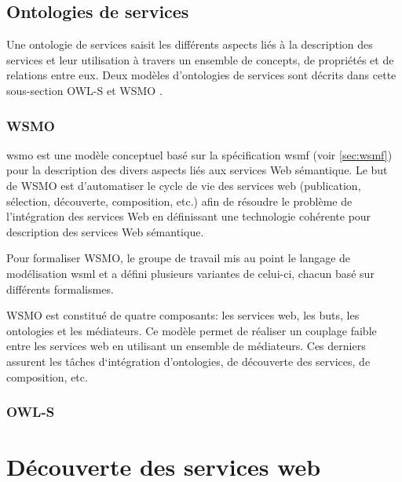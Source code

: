   \subsection{Ontologies de services}
  \label{sec:ont-serices}

  Une ontologie de services saisit les différents aspects liés à la
  description des services et leur utilisation à travers un ensemble
  de concepts, de propriétés et de relations entre eux. Deux modèles
  d'ontologies de services sont décrits dans cette sous-section
  \textsc{OWL-S} et \textsc{WSMO} \cite{elie2010}.

    \subsubsection{WSMO}
    \label{sec:wsmo}

    \acrshort{wsmo} \cite{de2005web} est une modèle conceptuel basé
    sur la spécification \acrshort{wsmf} \cite{fensel2002web} (voir
    \ref{sec:wsmf}) pour la description des divers aspects liés aux
    services Web sémantique. Le but de \textsc{WSMO} est d'automatiser
    le cycle de vie des services web (publication, sélection,
    découverte, composition, etc.) afin de résoudre le problème de
    l'intégration des services Web en définissant une technologie
    cohérente pour description des services Web sémantique.

    Pour formaliser \textsc{WSMO}, le groupe de travail mis au point
    le langage de modélisation \acrshort{wsml} \cite{de2006web} et a
    défini plusieurs variantes de celui-ci, chacun basé sur différents
    formalismes.

    \textsc{WSMO} est constitué de quatre composants: les services
    web, les buts, les ontologies et les médiateurs. Ce modèle permet
    de réaliser un couplage faible entre les services web en utilisant
    un ensemble de médiateurs. Ces derniers assurent les tâches
    d‘intégration d'ontologies, de découverte des services, de
    composition, etc.

    \subsubsection{OWL-S}
    \label{sec:owl-s-1}
  \newpage

\section{Découverte des services web} 

